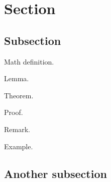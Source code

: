 \section{Section}

\subsection{Subsection}

\begin{defn}\label{def01:1}
	Math definition.
\end{defn}

\begin{lemma}\label{lemma:1}
	Lemma.
\end{lemma}

\begin{thm}\label{thm01:1}
	Theorem.
\end{thm}

\begin{myproof}
	Proof.
\end{myproof}

\begin{remark}
	Remark.
\end{remark}

\begin{example}\label{example01:1}
	Example.
\end{example}

\subsection{Another subsection}